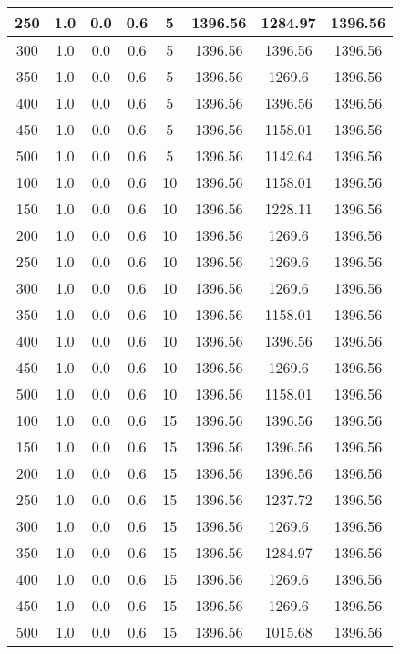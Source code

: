 \documentclass[a4paper, 12pt]{extreport}
\begin{document}
\begin{itemize}
\begin{longtable}{|c|c|c|c|c|c|c|c|}
			250 & 1.0 & 0.0 & 0.6 & 5 & 1396.56 & 1284.97 & 1396.56 \\\hline
			300 & 1.0 & 0.0 & 0.6 & 5 & 1396.56 & 1396.56 & 1396.56 \\\hline
			350 & 1.0 & 0.0 & 0.6 & 5 & 1396.56 & 1269.6 & 1396.56 \\\hline
			400 & 1.0 & 0.0 & 0.6 & 5 & 1396.56 & 1396.56 & 1396.56 \\\hline
			450 & 1.0 & 0.0 & 0.6 & 5 & 1396.56 & 1158.01 & 1396.56 \\\hline
			500 & 1.0 & 0.0 & 0.6 & 5 & 1396.56 & 1142.64 & 1396.56 \\\hline
			100 & 1.0 & 0.0 & 0.6 & 10 & 1396.56 & 1158.01 & 1396.56 \\\hline
			150 & 1.0 & 0.0 & 0.6 & 10 & 1396.56 & 1228.11 & 1396.56 \\\hline
			200 & 1.0 & 0.0 & 0.6 & 10 & 1396.56 & 1269.6 & 1396.56 \\\hline
			250 & 1.0 & 0.0 & 0.6 & 10 & 1396.56 & 1269.6 & 1396.56 \\\hline
			300 & 1.0 & 0.0 & 0.6 & 10 & 1396.56 & 1269.6 & 1396.56 \\\hline
			350 & 1.0 & 0.0 & 0.6 & 10 & 1396.56 & 1158.01 & 1396.56 \\\hline
			400 & 1.0 & 0.0 & 0.6 & 10 & 1396.56 & 1396.56 & 1396.56 \\\hline
			450 & 1.0 & 0.0 & 0.6 & 10 & 1396.56 & 1269.6 & 1396.56 \\\hline
			500 & 1.0 & 0.0 & 0.6 & 10 & 1396.56 & 1158.01 & 1396.56 \\\hline
			100 & 1.0 & 0.0 & 0.6 & 15 & 1396.56 & 1396.56 & 1396.56 \\\hline
			150 & 1.0 & 0.0 & 0.6 & 15 & 1396.56 & 1396.56 & 1396.56 \\\hline
			200 & 1.0 & 0.0 & 0.6 & 15 & 1396.56 & 1396.56 & 1396.56 \\\hline
			250 & 1.0 & 0.0 & 0.6 & 15 & 1396.56 & 1237.72 & 1396.56 \\\hline
			300 & 1.0 & 0.0 & 0.6 & 15 & 1396.56 & 1269.6 & 1396.56 \\\hline
			350 & 1.0 & 0.0 & 0.6 & 15 & 1396.56 & 1284.97 & 1396.56 \\\hline
			400 & 1.0 & 0.0 & 0.6 & 15 & 1396.56 & 1269.6 & 1396.56 \\\hline
			450 & 1.0 & 0.0 & 0.6 & 15 & 1396.56 & 1269.6 & 1396.56 \\\hline
			500 & 1.0 & 0.0 & 0.6 & 15 & 1396.56 & 1015.68 & 1396.56 \\\hline

\end{longtable}
\end{itemize}
\end{document}
